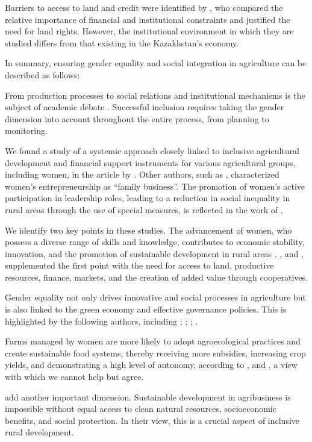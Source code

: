 \documentclass[pdflatex,sn-mathphys-ay]{sn-jnl}
\begin{document}
Barriers to access to land and credit were identified by
\citep{ref26,ref20,ref06}, who compared the
relative importance of financial and institutional constraints and
justified the need for land rights. However, the institutional
environment in which they are studied differs from that existing in the
Kazakhstan's economy.

In summary, ensuring gender equality and social integration in
agriculture can be described as follows:

From production processes to social relations and institutional
mechanisms is the subject of academic debate \citep{ref78,ref93,ref04}. Successful inclusion
requires taking the gender dimension into account throughout the entire
process, from planning to monitoring.

We found a study of a systemic approach closely linked to inclusive
agricultural development and financial support instruments for various
agricultural groups, including women, in the article by \citet{ref48}. Other authors, such as \citet{ref11},
characterized women's entrepreneurship as ``family business''. The
promotion of women's active participation in leadership roles, leading
to a reduction in social inequality in rural areas through the use of
special measures, is reflected in the work of \citet{ref82}.

We identify two key points in these studies. The advancement of women,
who possess a diverse range of skills and knowledge, contributes to
economic stability, innovation, and the promotion of sustainable
development in rural areas \citep{ref82}. \citet{ref75}, and \citet{ref02}, supplemented the first point
with the need for access to land, productive resources, finance,
markets, and the creation of added value through cooperatives.

Gender equality not only drives innovative and social processes in
agriculture but is also linked to the green economy and effective
governance policies. This is highlighted by the following authors,
including \citet{ref57}; \citet{ref31}; \citet{ref05}; \citet{ref106}.

Farms managed by women are more likely to adopt agroecological practices
and create sustainable food systems, thereby receiving more subsidies,
increasing crop yields, and demonstrating a high level of autonomy,
according to \citet{ref67}, and \citet{ref50},
a view with which we cannot help but agree.

\citet{ref92} add another important dimension.
Sustainable development in agribusiness is impossible without equal
access to clean natural resources, socioeconomic benefits, and social
protection. In their view, this is a crucial aspect of inclusive rural
development.
\end{document}
